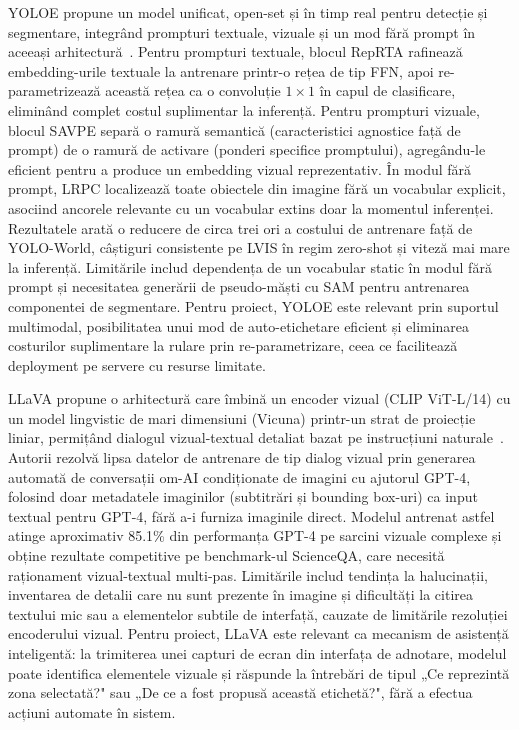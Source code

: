 YOLOE propune un model unificat, open-set și în timp real pentru detecție și segmentare, integrând prompturi textuale, vizuale și un mod fără prompt în aceeași arhitectură~\cite{wang2025yoloerealtimeseeing}. Pentru prompturi textuale, blocul RepRTA rafinează embedding-urile textuale la antrenare printr-o rețea de tip FFN, apoi re-parametrizează această rețea ca o convoluție $1\times1$ în capul de clasificare, eliminând complet costul suplimentar la inferență. Pentru prompturi vizuale, blocul SAVPE separă o ramură semantică (caracteristici agnostice față de prompt) de o ramură de activare (ponderi specifice promptului), agregându-le eficient pentru a produce un embedding vizual reprezentativ. În modul fără prompt, LRPC localizează toate obiectele din imagine fără un vocabular explicit, asociind ancorele relevante cu un vocabular extins doar la momentul inferenței. Rezultatele arată o reducere de circa trei ori a costului de antrenare față de YOLO-World, câștiguri consistente pe LVIS în regim zero-shot și viteză mai mare la inferență. Limitările includ dependența de un vocabular static în modul fără prompt și necesitatea generării de pseudo-măști cu SAM pentru antrenarea componentei de segmentare. Pentru proiect, YOLOE este relevant prin suportul multimodal, posibilitatea unui mod de auto-etichetare eficient și eliminarea costurilor suplimentare la rulare prin re-parametrizare, ceea ce facilitează deployment pe servere cu resurse limitate.

LLaVA propune o arhitectură care îmbină un encoder vizual (CLIP ViT-L/14) cu un model lingvistic de mari dimensiuni (Vicuna) printr-un strat de proiecție liniar, permițând dialogul vizual-textual detaliat bazat pe instrucțiuni naturale~\cite{liu2023visualinstructiontuning}. Autorii rezolvă lipsa datelor de antrenare de tip dialog vizual prin generarea automată de conversații om-AI condiționate de imagini cu ajutorul GPT-4, folosind doar metadatele imaginilor (subtitrări și bounding box-uri) ca input textual pentru GPT-4, fără a-i furniza imaginile direct. Modelul antrenat astfel atinge aproximativ 85.1\% din performanța GPT-4 pe sarcini vizuale complexe și obține rezultate competitive pe benchmark-ul ScienceQA, care necesită raționament vizual-textual multi-pas. Limitările includ tendința la halucinații, inventarea de detalii care nu sunt prezente în imagine și dificultăți la citirea textului mic sau a elementelor subtile de interfață, cauzate de limitările rezoluției encoderului vizual. Pentru proiect, LLaVA este relevant ca mecanism de asistență inteligentă: la trimiterea unei capturi de ecran din interfața de adnotare, modelul poate identifica elementele vizuale și răspunde la întrebări de tipul „Ce reprezintă zona selectată?" sau „De ce a fost propusă această etichetă?", fără a efectua acțiuni automate în sistem.

